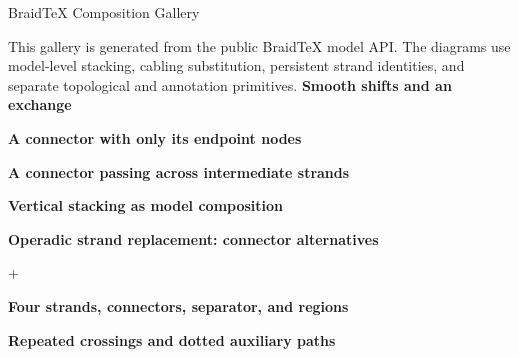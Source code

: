 \documentclass[11pt]{article}
\begin{document}
\begin{center}{\LARGE BraidTeX Composition Gallery}\end{center}
\small This gallery is generated from the public BraidTeX model API. The diagrams use model-level stacking, cabling substitution, persistent strand identities, and separate topological and annotation primitives.
\medskip
\needspace{6.3cm}
\textbf{Smooth shifts and an exchange}\par
\smallskip
\begin{center}\resizebox{!}{5.0cm}{}\end{center}
\smallskip
\needspace{6.3cm}
\textbf{A connector with only its endpoint nodes}\par
\smallskip
\begin{center}\resizebox{!}{5.0cm}{}\end{center}
\smallskip
\needspace{6.3cm}
\textbf{A connector passing across intermediate strands}\par
\smallskip
\begin{center}\resizebox{!}{5.0cm}{}\end{center}
\smallskip
\needspace{6.3cm}
\textbf{Vertical stacking as model composition}\par
\smallskip
\begin{center}\resizebox{!}{5.0cm}{}\end{center}
\smallskip
\needspace{6.3cm}
\textbf{Operadic strand replacement: connector alternatives}\par
\smallskip
\begin{center}\resizebox{!}{4.2cm}{}\quad$+$\quad\resizebox{!}{4.2cm}{}\end{center}
\smallskip
\needspace{6.3cm}
\textbf{Four strands, connectors, separator, and regions}\par
\smallskip
\begin{center}\resizebox{!}{5.0cm}{}\end{center}
\smallskip
\needspace{6.3cm}
\textbf{Repeated crossings and dotted auxiliary paths}\par
\smallskip
\begin{center}\resizebox{!}{5.0cm}{}\end{center}
\smallskip
\end{document}
